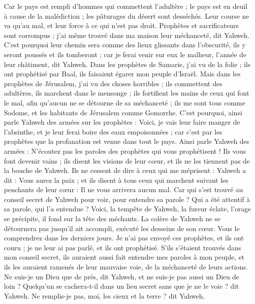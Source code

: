 \begin{multicols}{2}
Car le pays est rempli d'hommes qui commettent l’adultère ; le pays est en deuil à cause de la malédiction ; les pâturages du désert sont desséchés. Leur course ne va qu’au mal, et leur force à ce qui n’est pas droit.
Prophètes et sacrificateurs sont corrompus ; j'ai même trouvé dans ma maison leur méchanceté, dit Yahweh.
C'est pourquoi leur chemin sera comme des lieux glissants dans l’obscurité, ils y seront poussés et ils tomberont ; car je ferai venir sur eux le malheur, l'année de leur châtiment, dit Yahweh.
Dans les prophètes de Samarie, j’ai vu de la folie ; ils ont prophétisé par Baal, ils faisaient égarer mon peuple d’Israël.
Mais dans les prophètes de Jérusalem, j’ai vu des choses horribles ; ils commettent des adultères, ils marchent dans le mensonge ; ils fortifient les mains de ceux qui font le mal, afin qu’aucun ne se détourne de sa méchanceté ; ils me sont tous comme Sodome, et les habitants de Jérusalem comme Gomorrhe.
C'est pourquoi, ainsi parle Yahweh des armées sur les prophètes : Voici, je vais leur faire manger de l'absinthe, et je leur ferai boire des eaux empoisonnées ; car c’est par les prophètes que la profanation est venue dans tout le pays.
Ainsi parle Yahweh des armées : N'écoutez pas les paroles des prophètes qui vous prophétisent ! Ils vous font devenir vains ; ils disent les visions de leur cœur, et ils ne les tiennent pas de la bouche de Yahweh.
Ils ne cessent de dire à ceux qui me méprisent : Yahweh a dit : Vous aurez la paix ; et ils disent à tous ceux qui marchent suivant les penchants de leur cœur : Il ne vous arrivera aucun mal.
Car qui s'est trouvé au conseil secret de Yahweh pour voir, pour entendre sa parole ? Qui a été attentif à sa parole, qui l'a entendue ?
Voici, la tempête de Yahweh, la fureur éclate, l’orage se précipite, il fond sur la tête des méchants.
La colère de Yahweh ne se détournera pas jusqu’il ait accompli, exécuté les desseins de son cœur. Vous le comprendrez dans les derniers jours.
Je n'ai pas envoyé ces prophètes, et ils ont couru ; je ne leur ai pas parlé, et ils ont prophétisé.
S'ils s'étaient trouvés dans mon conseil secret, ils auraient aussi fait entendre mes paroles à mon peuple, et ils les auraient ramenés de leur mauvaise voie, de la méchanceté de leurs actions.
Ne suis-je un Dieu que de près, dit Yahweh, et ne suis-je pas aussi un Dieu de loin ?
Quelqu'un se cachera-t-il dans un lieu secret sans que je ne le voie ? dit Yahweh. Ne remplis-je pas, moi, les cieux et la terre ? dit Yahweh.

\end{multicols}
